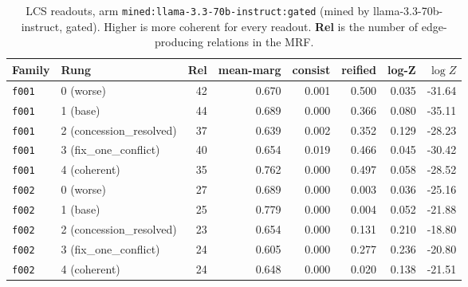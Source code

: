 \documentclass[11pt]{article}
\begin{document}
\begin{table}[htbp]
\centering
\small
\caption{LCS readouts, arm \texttt{mined:llama-3.3-70b-instruct:gated} (mined by llama-3.3-70b-instruct, gated). Higher is more coherent for every readout. \textbf{Rel} is the number of edge-producing relations in the MRF.}
\label{tab:scores-mined-llama-3-3-70b-instruct-gated}
\begin{tabular}{llrrrrrr}
\toprule
Family & Rung & Rel & \textbf{mean-marg} & \textbf{consist} & \textbf{reified} & \textbf{log-Z} & $\log Z$ \\
\midrule
\texttt{f001} & 0 (worse) & 42 & 0.670 & 0.001 & 0.500 & 0.035 & -31.64 \\
\texttt{f001} & 1 (base) & 44 & 0.689 & 0.000 & 0.366 & 0.080 & -35.11 \\
\texttt{f001} & 2 (concession\_resolved) & 37 & 0.639 & 0.002 & 0.352 & 0.129 & -28.23 \\
\texttt{f001} & 3 (fix\_one\_conflict) & 40 & 0.654 & 0.019 & 0.466 & 0.045 & -30.42 \\
\texttt{f001} & 4 (coherent) & 35 & 0.762 & 0.000 & 0.497 & 0.058 & -28.52 \\
\midrule
\texttt{f002} & 0 (worse) & 27 & 0.689 & 0.000 & 0.003 & 0.036 & -25.16 \\
\texttt{f002} & 1 (base) & 25 & 0.779 & 0.000 & 0.004 & 0.052 & -21.88 \\
\texttt{f002} & 2 (concession\_resolved) & 23 & 0.654 & 0.000 & 0.131 & 0.210 & -18.80 \\
\texttt{f002} & 3 (fix\_one\_conflict) & 24 & 0.605 & 0.000 & 0.277 & 0.236 & -20.80 \\
\texttt{f002} & 4 (coherent) & 24 & 0.648 & 0.000 & 0.020 & 0.138 & -21.51 \\
\bottomrule
\end{tabular}
\end{table}
\end{document}
